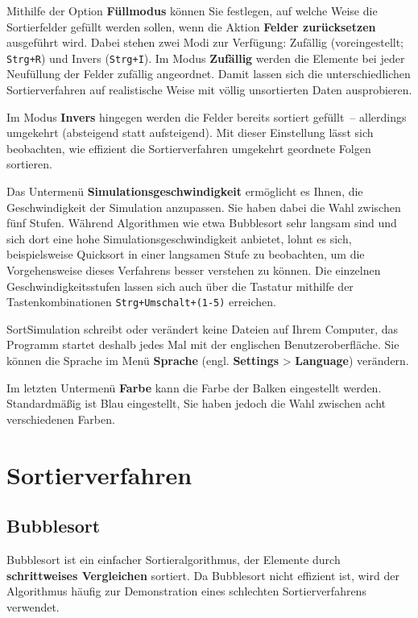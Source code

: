 \documentclass[11pt, a4paper, titlepage, oneside]{article}
\renewcommand{\emph}{\textbf}
\begin{document}
	Mithilfe der Option \emph{Füllmodus} können Sie festlegen, auf welche Weise die Sortierfelder gefüllt werden sollen, wenn die Aktion \emph{Felder zurücksetzen} ausgeführt wird. Dabei stehen zwei Modi zur Verfügung: Zufällig (voreingestellt; \texttt{Strg+R}) und Invers (\texttt{Strg+I}). Im Modus \emph{Zufällig} werden die Elemente bei jeder Neufüllung der Felder zufällig angeordnet. Damit lassen sich die unterschiedlichen Sortierverfahren auf realistische Weise mit völlig unsortierten Daten ausprobieren.
	
	Im Modus \emph{Invers} hingegen werden die Felder bereits sortiert gefüllt~-- allerdings umgekehrt (absteigend statt aufsteigend). Mit dieser Einstellung lässt sich beobachten, wie effizient die Sortierverfahren umgekehrt geordnete Folgen sortieren.
	
	Das Untermenü \emph{Simulationsgeschwindigkeit} ermöglicht es Ihnen, die Geschwindigkeit der Simulation anzupassen. Sie haben dabei die Wahl zwischen fünf Stufen. Während Algorithmen wie etwa Bubblesort sehr langsam sind und sich dort eine hohe Simulationsgeschwindigkeit anbietet, lohnt es sich, beispielsweise Quicksort in einer langsamen Stufe zu beobachten, um die Vorgehensweise dieses Verfahrens besser verstehen zu können. Die einzelnen Geschwindigkeitsstufen lassen sich auch über die Tastatur mithilfe der Tastenkombinationen \texttt{Strg+Umschalt+(1-5)} erreichen.
	
	SortSimulation schreibt oder verändert keine Dateien auf Ihrem Computer, das Programm startet deshalb jedes Mal mit der englischen Benutzeroberfläche. Sie können die Sprache im Menü \emph{Sprache} (engl. \emph{Settings} > \emph{Language}) verändern.
	
	Im letzten Untermenü \emph{Farbe} kann die Farbe der Balken eingestellt werden. Stan\-{}dard\-{}mäßig ist Blau eingestellt, Sie haben jedoch die Wahl zwischen acht verschiedenen Farben.
	
	\section{Sortierverfahren}
	
	\subsection{Bubblesort}
	
	Bubblesort ist ein einfacher Sortieralgorithmus, der Elemente durch \emph{schrittweises Vergleichen} sortiert. Da Bubblesort nicht effizient ist, wird der Algorithmus häufig zur Demonstration eines schlechten Sortierverfahrens verwendet.
	
\end{document}
